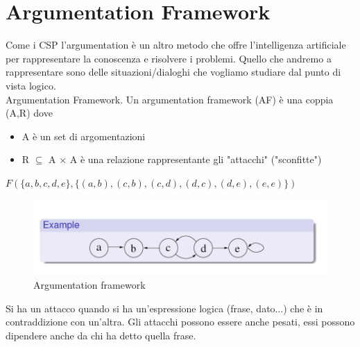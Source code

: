 \section{Argumentation Framework}
Come i CSP l'argumentation è un altro metodo che offre l'intelligenza artificiale per rappresentare la conoscenza e risolvere i problemi. Quello che andremo a rappresentare sono delle situazioni/dialoghi che vogliamo studiare dal punto di vista logico.
\\Argumentation Framework. Un argumentation framework (AF) è una coppia (A,R) dove
\begin{itemize}
    \item A è un set di argomentazioni
    \item R $\subseteq$ A × A è una relazione rappresentante gli "attacchi" ("sconfitte")
\end{itemize}
\begin{center}
    $F(\{a,b,c,d,e\}, \{(a,b),(c,b),(c,d),(d,c),(d,e),(e,e)\})$
\end{center}
\begin{figure}[H]
    \centering
    \includegraphics[width=12cm, keepaspectratio]{img/Cap6/arg1.png}
    \caption{Argumentation framework}
\end{figure}
Si ha un attacco quando si ha un'espressione logica (frase, dato...) che è in contraddizione con un'altra. Gli attacchi possono essere anche pesati, essi possono dipendere anche da chi ha detto quella frase.

